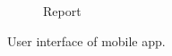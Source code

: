 \begin{figure}
\begin{subfigure}[b]{0.125\textwidth}
        \caption{Report}
        \label{fig:documentation}
    \end{subfigure}
    \hfill %
    \vspace{0.2cm}
    \caption{User interface of mobile app.}\label{fig:hysterisis}
\end{figure}
